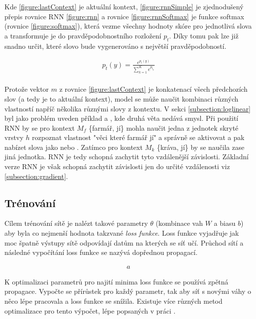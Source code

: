Kde \ref{figure:lastContext} je aktuální kontext, \ref{figure:rnnSimple} je zjednodušený přepis rovnice RNN \ref{figure:rnn} a rovnice \ref{figure:rnnSoftmax} je funkce softmax (rovnice \ref{figure:softmax}), která vezme všechny hodnoty skóre pro jednotlivá slova a transformuje je do pravděpodobnostního rozložení $p_t$. Díky tomu pak lze již snadno určit, které slovo bude vygenerováno s největší pravděpodobností.


\begin{align}\label{figure:softmax}
  p_t(y)={\frac {e^{p_{t}(y)}}{\sum _{k=1}^{K}e^{p_{t_{k}}}}}
\end{align}
\\


Protože vektor $m$ z rovnice \ref{figure:lastContext} je konkatenací všech předchozích slov (a tedy je to aktuální kontext), model se může naučit kombinaci různých vlastností napříč několika různými slovy z kontextu. V sekci \ref{subsection:loglinear} byl jako problém uveden příklad  a , kde druhá věta nedává smysl. Při použití RNN by se pro kontext $M_f$  \{farmář, jí\} mohla naučit jedna z jednotek skryté vrstvy $h$ rozpoznat vlastnost "věci které farmář jí" a správně se aktivovat a pak nabízet slova jako  nebo . Zatímco pro kontext $M_k$ \{kráva, jí\} by se naučila zase jiná jednotka. RNN je tedy schopná zachytit tyto vzdálenější závislosti. Základní verze RNN je však schopná zachytit závislosti jen do určité vzdálenosti viz \ref{subsection:gradient}.


\subsection{Trénování} \label{subsection:training}
Cílem trénování sítě je nalézt takové parametry $\theta$ (kombinace vah $W$ a biasu $b$) aby byla co nejmenší hodnota takzvané \emph{loss funkce}. Loss funkce vyjadřuje jak moc špatně výstupy sítě odpovídají datům na kterých se síť učí. Průchod sítí a následné vypočítání loss funkce se nazývá dopřednou propagací.


\begin{align}\label{figure:loss}
  a
\end{align}

K optimalizaci parametrů pro najití minima loss funkce se používá zpětná propagace. Vypočte se přírůstek pro každý parametr, tak aby síť s novými váhy o něco lépe pracovala a loss funkce se snížila. Existuje více různých metod optimalizace pro tento výpočet, lépe popsaných v práci \cite{gradientDescent}.

